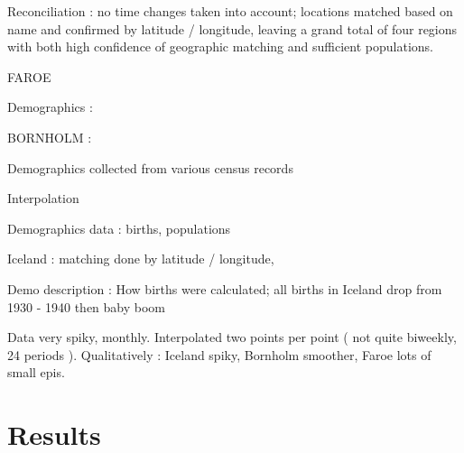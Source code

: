 \documentclass[10pt]{article}
\begin{document}
Reconciliation : no time changes taken into account; locations matched based on name and confirmed by latitude / longitude, leaving a grand total of four regions with both high confidence of geographic matching and sufficient populations.





FAROE

Demographics : 






BORNHOLM :

Demographics collected from various census records





Interpolation

Demographics data : births, populations

Iceland : matching done by latitude / longitude, 







Demo description : 
How births were calculated; all births in Iceland drop from 1930 - 1940 then baby boom





Data very spiky, monthly. Interpolated two points per point ( not quite biweekly, 24 periods ). Qualitatively : Iceland spiky, Bornholm smoother, Faroe lots of small epis. 



\section*{Results}
\end{document}

